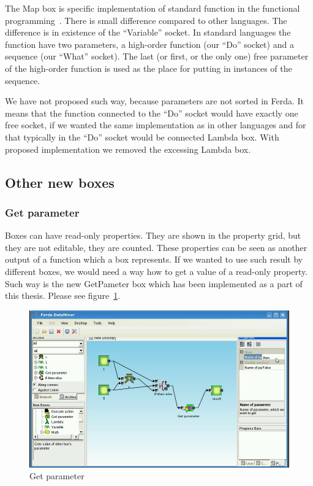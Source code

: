 \documentclass[a4paper,12pt]{book}
\begin{document}
The Map box is specific implementation of standard function in the functional programming~\cite{WikiMap}. There is small difference compared to other languages. The difference is in existence of the ``Variable'' socket. In standard languages the function have two parameters, a high-order function (our ``Do'' socket) and a sequence (our ``What'' socket). The last (or first, or the only one) free parameter of the high-order function is used as the place for putting in instances of the sequence.

We have not proposed such way, because parameters are not sorted in Ferda. It means that the function connected to the ``Do'' socket would have exactly one free socket, if we wanted the same implementation as in other languages and for that typically in the ``Do'' socket would be connected Lambda box. With proposed implementation we removed the excessing Lambda box.

\subsection{Other new boxes}
\subsubsection{Get parameter}
Boxes can have read-only properties. They are shown in the property grid, but they are not editable, they are counted. These properties can be seen as another output of a function which a box represents. If we wanted to use such result by different boxes, we would need a way how to get a value of a read-only property. Such way is the new GetPameter box which has been implemented as a part of this thesis. Please see figure~\ref{fig:boxGetParameter}.

\begin{figure}
	\includegraphics[width=1\textwidth]{getParameter2.png}
	\caption{Get parameter}
	\label{fig:boxGetParameter}
\end{figure}
\end{document}
